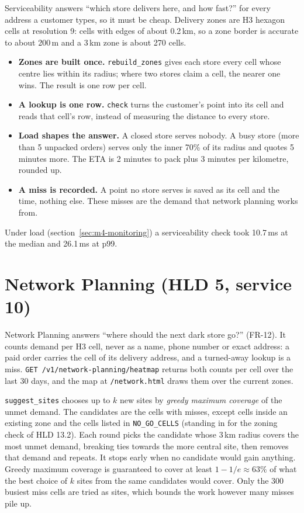 Serviceability answers ``which store delivers here, and how fast?'' for every address a customer types, so it must
be cheap. Delivery zones are H3 hexagon cells at resolution 9: cells with edges of about 0.2\,km, so a zone border is
accurate to about 200\,m and a 3\,km zone is about 270 cells.
\begin{itemize}
  \item \textbf{Zones are built once.} \texttt{rebuild\_zones} gives each store every cell whose centre lies within its
    radius; where two stores claim a cell, the nearer one wins. The result is one row per cell.
  \item \textbf{A lookup is one row.} \texttt{check} turns the customer's point into its cell and reads that cell's
    row, instead of measuring the distance to every store.
  \item \textbf{Load shapes the answer.} A closed store serves nobody. A busy store (more than 5 unpacked orders)
    serves only the inner 70\% of its radius and quotes 5 minutes more. The ETA is 2 minutes to pack plus 3 minutes
    per kilometre, rounded up.
  \item \textbf{A miss is recorded.} A point no store serves is saved as its cell and the time, nothing else. These
    misses are the demand that network planning works from.
\end{itemize}
Under load (section~\ref{sec:m4-monitoring}) a serviceability check took 10.7\,ms at the median and 26.1\,ms at p99.

\section{Network Planning (HLD 5, service 10)}

Network Planning answers ``where should the next dark store go?'' (FR-12). It counts demand per H3 cell, never as a
name, phone number or exact address: a paid order carries the cell of its delivery address, and a turned-away
lookup is a miss. \texttt{GET /v1/network-planning/heatmap} returns both counts per cell over the last 30 days, and
the map at \texttt{/network.html} draws them over the current zones.

\texttt{suggest\_sites} chooses up to $k$ new sites by \emph{greedy maximum coverage} of the unmet demand. The
candidates are the cells with misses, except cells inside an existing zone and the cells listed in
\texttt{NO\_GO\_CELLS} (standing in for the zoning check of HLD 13.2). Each round picks the candidate whose 3\,km
radius covers the most unmet demand, breaking ties towards the more central site, then removes that demand and
repeats. It stops early when no candidate would gain anything. Greedy maximum coverage is guaranteed to cover at
least $1 - 1/e \approx 63\%$ of what the best choice of $k$ sites from the same candidates would cover. Only the 300
busiest miss cells are tried as sites, which bounds the work however many misses pile up.

